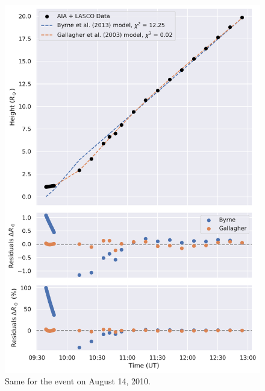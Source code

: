 \begin{figure}[!htp]
	\centering
	\includegraphics[width=0.8\hsize]{chapter2/figs/appendix/height_profile_residuals_aia_lasco_100814_01.pdf}
	\caption{Same for the event on August 14, 2010.}
\end{figure}

